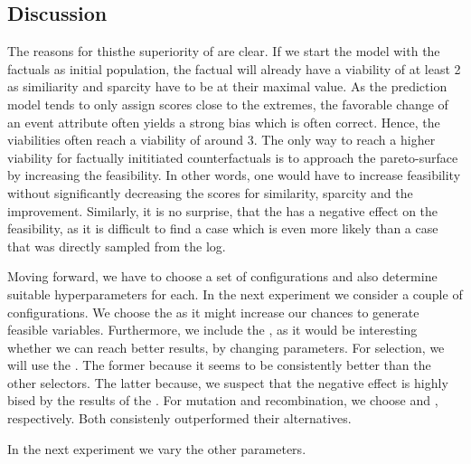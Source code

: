 \documentclass[./../../paper.tex]{subfiles}
\begin{document}
\subsection{Discussion}
The reasons for thisthe superiority of  are clear. If we start the model with the factuals as initial population, the factual will already have a viability of at least 2 as similiarity and sparcity have to be at their maximal value. As the prediction model tends to only assign scores close to the extremes, the favorable change of an event attribute often yields a strong bias which is often correct. Hence, the viabilities often reach a viability of around 3. The only way to reach a higher viability for factually inititiated counterfactuals is to approach the pareto-surface by increasing the feasibility. In other words, one would have to increase feasibility without significantly decreasing the scores for similarity, sparcity and the improvement. Similarly, it is no surprise, that the  has a negative effect on the feasibility, as it is difficult to find a case which is even more likely than a case that was directly sampled from the log.

Moving forward, we have to choose a set of configurations and also determine suitable hyperparameters for each. In the next experiment we consider a couple of configurations. We choose the  as it might increase our chances to generate feasible variables. Furthermore, we include the , as it would be interesting whether we can reach better results, by changing parameters. For selection, we will use the . The former because it seems to be consistently better than the other selectors. The latter because, we suspect that the negative effect is highly bised by the results of the . For mutation and recombination, we choose  and , respectively. Both consistenly outperformed their alternatives.

In the next experiment we vary the other parameters.
\end{document}
